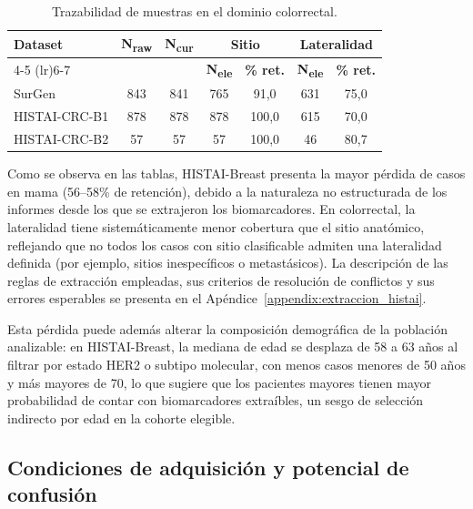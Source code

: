 \begin{table}[htbp]
\centering
\caption{Trazabilidad de muestras en el dominio colorrectal.}
\label{tab:trazabilidad_colorrectal}
\footnotesize
\setlength{\tabcolsep}{4pt}
\begin{tabular}{lcccccc}
\toprule
\multirow{2}{*}{\textbf{Dataset}} & \multirow{2}{*}{\textbf{N\textsubscript{raw}}} & \multirow{2}{*}{\textbf{N\textsubscript{cur}}}
  & \multicolumn{2}{c}{\textbf{Sitio}} & \multicolumn{2}{c}{\textbf{Lateralidad}} \\
\cmidrule(lr){4-5} \cmidrule(lr){6-7}
& & & \textbf{N\textsubscript{ele}} & \textbf{\% ret.} & \textbf{N\textsubscript{ele}} & \textbf{\% ret.} \\
\midrule
SurGen & 843 & 841 & 765 & 91,0 & 631 & 75,0 \\
HISTAI-CRC-B1 & 878 & 878 & 878 & 100,0 & 615 & 70,0 \\
HISTAI-CRC-B2 & 57 & 57 & 57 & 100,0 & 46 & 80,7 \\
\bottomrule
\end{tabular}
\end{table}

Como se observa en las tablas, HISTAI-Breast presenta la mayor pérdida de casos en mama (56--58\% de retención), debido a la naturaleza no estructurada de los informes desde los que se extrajeron los biomarcadores. En colorrectal, la lateralidad tiene sistemáticamente menor cobertura que el sitio anatómico, reflejando que no todos los casos con sitio clasificable admiten una lateralidad definida (por ejemplo, sitios inespecíficos o metastásicos). La descripción de las reglas de extracción empleadas, sus criterios de resolución de conflictos y sus errores esperables se presenta en el Apéndice~\ref{appendix:extraccion_histai}.

Esta pérdida puede además alterar la composición demográfica de la población analizable: en HISTAI-Breast, la mediana de edad se desplaza de 58 a 63 años al filtrar por estado HER2 o subtipo molecular, con menos casos menores de 50 años y más mayores de 70, lo que sugiere que los pacientes mayores tienen mayor probabilidad de contar con biomarcadores extraíbles, un sesgo de selección indirecto por edad en la cohorte elegible.

\subsection{Condiciones de adquisición y potencial de confusión}
\label{sec:adquisicion}

